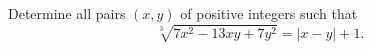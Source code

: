 Determine all pairs $(x, y)$ of positive integers such that
\[ \sqrt[3]{7x^2 - 13xy + 7y^2} = |x - y| + 1. \]
